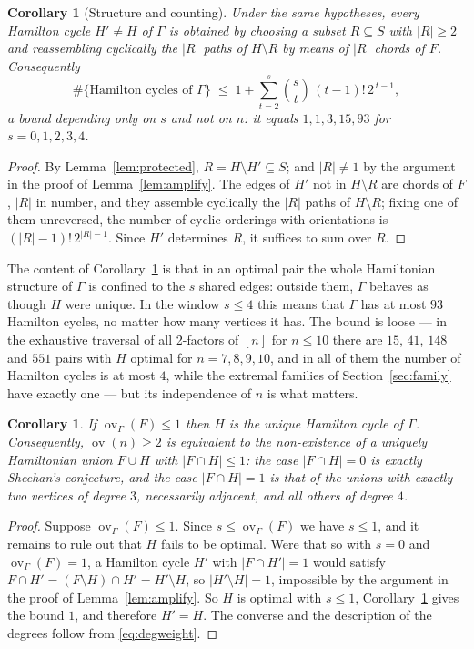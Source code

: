 \documentclass[11pt,a4paper]{article}
\newtheorem{corollary}[theorem]{Corollary}
\theoremstyle{definition}
\theoremstyle{remark}
\newcommand{\ov}{\operatorname{ov}}
\begin{document}
\begin{corollary}[Structure and counting]\label{cor:count}
Under the same hypotheses, every Hamilton cycle $H'\ne H$ of $\Gamma$ is obtained by choosing a subset $R\subseteq S$ with $|R|\ge2$ and reassembling cyclically the $|R|$ paths of $H\setminus R$ by means of $|R|$ chords of $F$. Consequently
\[
\#\{\text{Hamilton cycles of }\Gamma\}\;\le\;1+\sum_{t=2}^{s}\binom{s}{t}\,(t-1)!\,2^{\,t-1},
\]
a bound depending only on $s$ and not on $n$: it equals $1,1,3,15,93$ for $s=0,1,2,3,4$.
\end{corollary}

\begin{proof}
By Lemma~\ref{lem:protected}, $R=H\setminus H'\subseteq S$; and $|R|\ne1$ by the argument in the proof of Lemma~\ref{lem:amplify}. The edges of $H'$ not in $H\setminus R$ are chords of $F$, $|R|$ in number, and they assemble cyclically the $|R|$ paths of $H\setminus R$; fixing one of them unreversed, the number of cyclic orderings with orientations is $(|R|-1)!\,2^{|R|-1}$. Since $H'$ determines $R$, it suffices to sum over $R$.
\end{proof}

The content of Corollary~\ref{cor:count} is that in an optimal pair the whole Hamiltonian structure of $\Gamma$ is confined to the $s$ shared edges: outside them, $\Gamma$ behaves as though $H$ were unique. In the window $s\le4$ this means that $\Gamma$ has at most $93$ Hamilton cycles, no matter how many vertices it has. The bound is loose --- in the exhaustive traversal of all 2-factors of $[n]$ for $n\le10$ there are $15$, $41$, $148$ and $551$ pairs with $H$ optimal for $n=7,8,9,10$, and in all of them the number of Hamilton cycles is at most $4$, while the extremal families of Section~\ref{sec:family} have exactly one --- but its independence of $n$ is what matters.

\begin{corollary}\label{cor:ov2}
If $\ov_\Gamma(F)\le1$ then $H$ is the unique Hamilton cycle of $\Gamma$. Consequently, $\ov(n)\ge2$ is equivalent to the non-existence of a uniquely Hamiltonian union $F\cup H$ with $|F\cap H|\le1$: the case $|F\cap H|=0$ is exactly Sheehan's conjecture, and the case $|F\cap H|=1$ is that of the unions with exactly two vertices of degree $3$, necessarily adjacent, and all others of degree $4$.
\end{corollary}

\begin{proof}
Suppose $\ov_\Gamma(F)\le1$. Since $s\le\ov_\Gamma(F)$ we have $s\le1$, and it remains to rule out that $H$ fails to be optimal. Were that so with $s=0$ and $\ov_\Gamma(F)=1$, a Hamilton cycle $H'$ with $|F\cap H'|=1$ would satisfy $F\cap H'=(F\setminus H)\cap H'=H'\setminus H$, so $|H'\setminus H|=1$, impossible by the argument in the proof of Lemma~\ref{lem:amplify}. So $H$ is optimal with $s\le1$, Corollary~\ref{cor:count} gives the bound $1$, and therefore $H'=H$. The converse and the description of the degrees follow from \eqref{eq:degweight}.
\end{proof}
\end{document}
